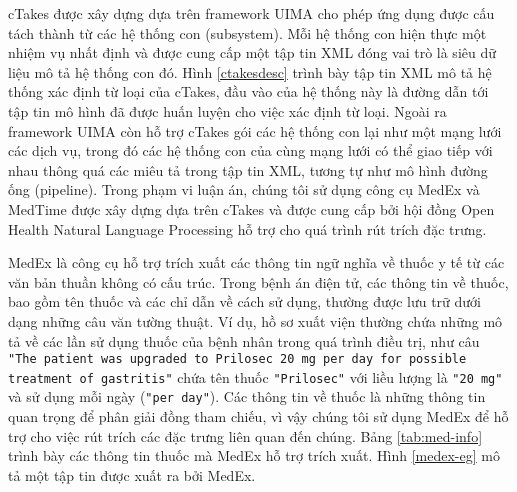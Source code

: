 cTakes được xây dựng dựa trên framework UIMA cho phép ứng dụng được cấu tách thành từ các hệ thống con (subsystem). Mỗi hệ thống con hiện thực một nhiệm vụ nhất định và được cung cấp một tập tin XML đóng vai trò là siêu dữ liệu mô tả hệ thống con đó. Hình \ref{ctakesdesc} trình bày tập tin XML mô tả hệ thống xác định từ loại của cTakes, đầu vào của hệ thống này là đường dẫn tới tập tin mô hình đã được huấn luyện cho việc xác định từ loại. Ngoài ra framework UIMA còn hỗ trợ cTakes gói các hệ thống con lại như một mạng lưới các dịch vụ, trong đó các hệ thống con của cùng mạng lưới có thể giao tiếp với nhau thông quá các miêu tả trong tập tin XML, tương tự như mô hình đường ống (pipeline). Trong phạm vi luận án, chúng tôi sử dụng công cụ MedEx \cite{HuaXu2009} và MedTime \cite{Sohn2013} được xây dựng dựa trên cTakes và được cung cấp bởi hội đồng Open Health Natural Language Processing hỗ trợ cho quá trình rút trích đặc trưng.

MedEx là công cụ hỗ trợ trích xuất các thông tin ngữ nghĩa về thuốc y tế từ các văn bản thuần không có cấu trúc. Trong bệnh án điện tử, các thông tin về thuốc, bao gồm tên thuốc và các chỉ dẫn về cách sử dụng, thường được lưu trữ dưới dạng những câu văn tường thuật. Ví dụ, hồ sơ xuất viện thường chứa những mô tả về các lần sử dụng thuốc của bệnh nhân trong quá trình điều trị, như câu \texttt{"The patient was upgraded to Prilosec 20 mg per day for possible treatment of gastritis"} chứa tên thuốc \texttt{"Prilosec"} với liều lượng là \texttt{"20 mg"} và sử dụng mỗi ngày (\texttt{"per day"}). Các thông tin về thuốc là những thông tin quan trọng để phân giải đồng tham chiếu, vì vậy chúng tôi sử dụng MedEx để hỗ trợ cho việc rút trích các đặc trưng liên quan đến chúng. Bảng \ref{tab:med-info} trình bày các thông tin thuốc mà MedEx hỗ trợ trích xuất. Hình \ref{medex-eg} mô tả một tập tin được xuất ra bởi MedEx.
%
%

